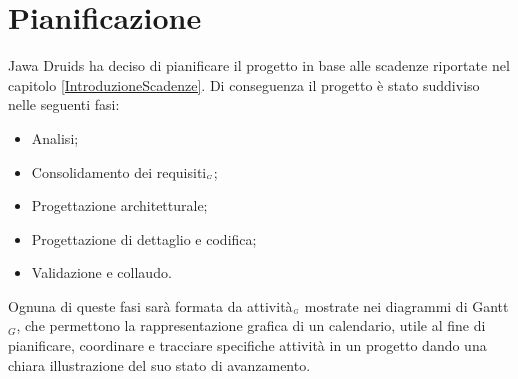 \chapter{Pianificazione}\label{Pianificazione}
Jawa Druids ha deciso di pianificare il progetto in base alle scadenze riportate nel capitolo \ref{IntroduzioneScadenze}. Di conseguenza il progetto è stato suddiviso nelle seguenti fasi:
\begin{itemize}
	\item Analisi;
	\item Consolidamento dei requisiti$_{\scaleto{G}{3pt}}$;
	\item Progettazione architetturale;
	\item Progettazione di dettaglio e codifica;
	\item Validazione e collaudo.
\end{itemize}
Ognuna di queste fasi sarà formata da attività$_{\scaleto{G}{3pt}}$ mostrate nei diagrammi di Gantt$_G$, che permettono la rappresentazione grafica di un calendario, utile al fine di pianificare, coordinare e tracciare specifiche attività in un progetto dando una chiara illustrazione del suo stato di avanzamento.
